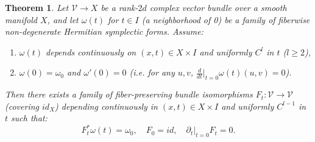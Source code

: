 \documentclass[11pt]{amsart}
\newtheorem{theorem}{Theorem}[section]
\theoremstyle{remark}
\theoremstyle{definition}
\newcommand{\V}{{\mathbf V}}
\def \V{\mathcal{V}}
\begin{document}
\begin{theorem}\label{thm: pure geo}
Let $\V \to X$ be a rank-$2d$ complex vector bundle over a smooth manifold $X$, and let $\omega(t)$ for $t \in I$ (a neighborhood of 0) be a family of fiberwise non-degenerate Hermitian symplectic forms. Assume:
\begin{enumerate}
    \item $\omega(t)$ depends continuously on $(x,t) \in X\times I$ and uniformly $C^l$ in $t$ ($l\geq 2$),
    \item $\omega(0) = \omega_0$ and $\omega'(0) = 0$ (i.e. for any $u,v$, $\frac{d}{dt}|_{t=0}  \omega(t)(u,v)=0$).
\end{enumerate}
Then there exists a family of fiber-preserving bundle isomorphisms $F_t: \V \to \V$ (covering $id_X$) depending continuously in $(x,t)\in X\times I$ and uniformly $C^{l-1}$ in $t$ such that:
\[
F_t^* \omega(t) = \omega_0, \quad F_0 = id, \quad \partial_t|_{t=0} F_t = 0.
\]
\end{theorem}
\end{document}
